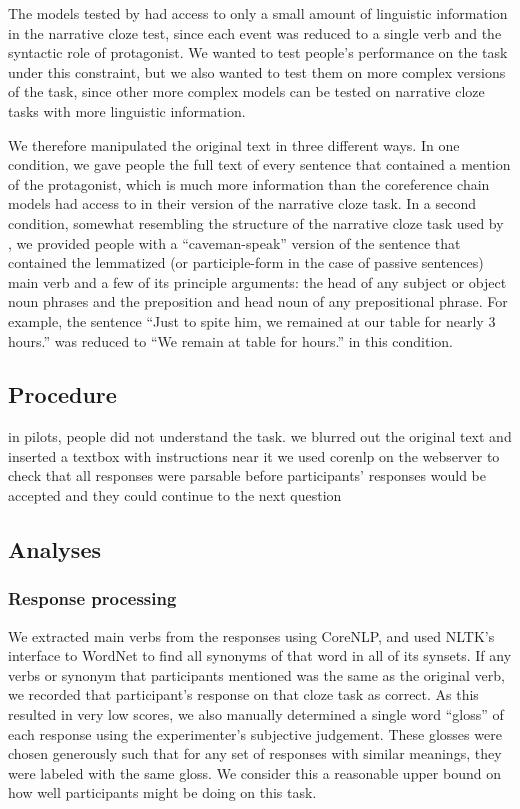 \documentclass[10pt,a4paper]{article}
\newcommand{\todo}[1]{{\color{red}#1}}
\begin{document}
The models tested by  had access to only a small amount of linguistic information in the narrative cloze test, since each event was reduced to a single verb and the syntactic role of protagonist.
We wanted to test people's performance on the task under this constraint, but we also wanted to test them on more complex versions of the task, since other more complex models can be tested on narrative cloze tasks with more linguistic information.

We therefore manipulated the original text in three different ways.
In one condition, we gave people the full text of every sentence that contained a mention of the protagonist, which is much more information than the coreference chain models had access to in their version of the narrative cloze task. In a second condition, somewhat resembling the structure of the narrative cloze task used by , we provided people with a ``caveman-speak'' version of the sentence that contained the lemmatized (or participle-form in the case of passive sentences) main verb and a few of its principle arguments: the head of any subject or object noun phrases and the preposition and head noun of any prepositional phrase. For example, the sentence ``Just to spite him, we remained at our table for nearly 3 hours.'' was reduced to ``We remain at table for hours.'' in this condition.

\subsection{Procedure}

\todo{
in pilots, people did not understand the task.
we blurred out the original text and inserted a textbox with instructions near it
we used corenlp on the webserver to check that all responses were parsable before participants' responses would be accepted and they could continue to the next question
}

\subsection{Analyses}

\subsubsection{Response processing}

We extracted main verbs from the responses using CoreNLP, and used NLTK's interface to WordNet  to find all synonyms of that word in all of its synsets. If any verbs or synonym that participants mentioned was the same as the original verb, we recorded that participant's response on that cloze task as correct.
As this resulted in very low scores, we also manually determined a single word ``gloss'' of each response using the experimenter's subjective judgement. These glosses were chosen generously such that for any set of responses with similar meanings, they were labeled with the same gloss. We consider this a reasonable upper bound on how well participants might be doing on this task.
\end{document}
